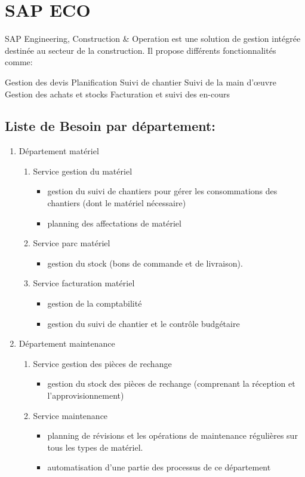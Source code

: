 \documentclass [a4paper] {report}
\begin{document}
\section{SAP ECO }
SAP Engineering, Construction & Operation est une solution de gestion intégrée destinée au secteur de la construction. Il propose différents fonctionnalités comme:

Gestion des devis
Planification
Suivi de chantier
Suivi de la main d’œuvre
Gestion des achats et stocks
Facturation et suivi des en-cours

\subsection{Liste de Besoin par département: }

\begin{enumerate}
\item Département matériel
	\begin {enumerate}
	\item Service gestion du matériel
		\begin{itemize}
		\item gestion du suivi de chantiers pour gérer les consommations des chantiers (dont le matériel nécessaire)
		\item planning des affectations de matériel
		\end{itemize}
   \item Service parc matériel
		\begin{itemize}
		\item gestion du stock (bons de commande et de livraison).
		\end{itemize}
   \item Service facturation matériel
	 	\begin{itemize}
		\item gestion de la comptabilité 
		\item gestion du suivi de chantier et le contrôle budgétaire
		\end{itemize}			
	\end{enumerate}


\item Département maintenance
	\begin {enumerate}
	\item Service gestion des pièces de rechange
		\begin{itemize}
		\item gestion du stock des pièces de rechange (comprenant la réception et l'approvisionnement)
		\end{itemize}	
	\item Service maintenance
		\begin{itemize}
		\item planning de révisions et les opérations de maintenance régulières sur tous les types de matériel.
		\item automatisation d'une partie des processus de ce département
		\end{itemize}
	\end{enumerate}
		

\end{enumerate}
\end{document}
